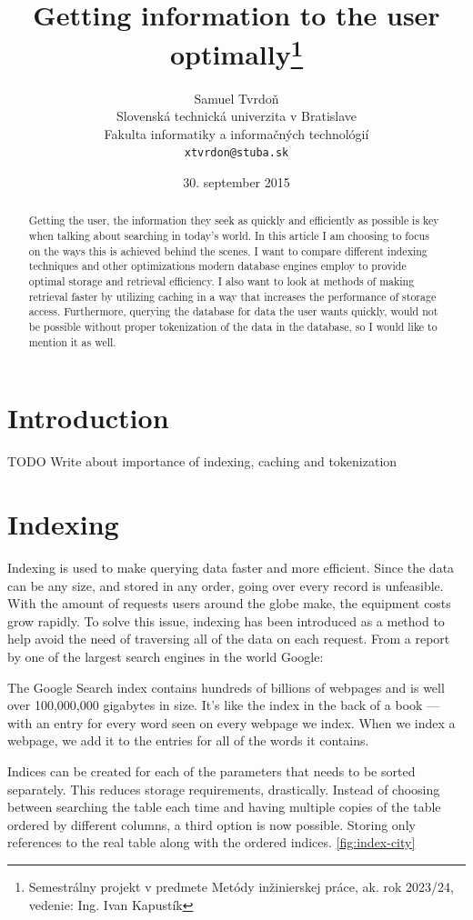 \documentclass[10pt,a4paper]{article}
\title{Getting information to the user optimally\thanks{Semestrálny projekt v predmete Metódy inžinierskej práce, ak. rok 2023/24, vedenie: Ing. Ivan Kapustík}}
\author{Samuel Tvrdoň\\[2pt]
	{\small Slovenská technická univerzita v Bratislave}\\
	{\small Fakulta informatiky a informačných technológií}\\
	{\small \texttt{xtvrdon@stuba.sk}}
	}
\date{\small 30. september 2015} %
\begin{document}
\maketitle

\begin{abstract}
Getting the user, the information they seek as quickly and efficiently as possible is key when talking about searching in today’s world. In this article I am choosing to focus on the ways this is achieved behind the scenes. I want to compare different indexing techniques and other optimizations modern database engines employ to provide optimal storage and retrieval efficiency. I also want to look at methods of making retrieval faster by utilizing caching in a way that increases the performance of storage access. Furthermore, querying the database for data the user wants quickly, would not be possible without proper tokenization of the data in the database, so I would like to mention it as well.
\end{abstract}

\section{Introduction}
\cite{Database-indexing:-yesterday-and-today}
TODO Write about importance of indexing, caching and tokenization

\section{Indexing}
Indexing is used to make querying data faster and more efficient. Since the data can be any size,
and stored in any order, going over every record is unfeasible. With the amount of requests users around the globe make, the equipment costs grow rapidly. To solve this issue, indexing has been introduced as a method to help avoid the need of traversing all of the data on each request. From a report by one of the largest search engines in the world Google\cite{Google}:
\begin{displayquote}
The Google Search index contains hundreds of billions of webpages and is well over 100,000,000 gigabytes in size. It’s like the index in the back of a book — with an entry for every word seen on every webpage we index. When we index a webpage, we add it to the entries for all of the words it contains.
\end{displayquote}

Indices can be created for each of the parameters that needs to be sorted separately. This reduces storage requirements, drastically. Instead of choosing between searching the table each time and having multiple copies of the table ordered by different columns, a third option is now possible. Storing only references to the real table along with the ordered indices. \ref{fig:index-city}
\end{document}
